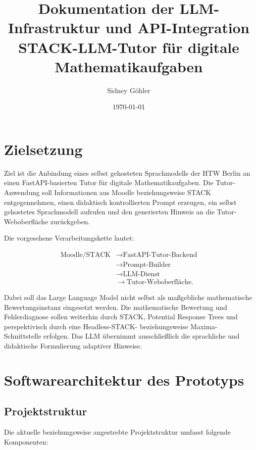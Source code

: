 \documentclass[11pt,a4paper,oneside,ngerman]{memoir}
\title{
    \textbf{Dokumentation der LLM-Infrastruktur und API-Integration}\\
    \large STACK-LLM-Tutor für digitale Mathematikaufgaben
}
\author{Sidney Göhler}
\date{\today}
\begin{document}
\maketitle
\tableofcontents
\clearpage

\chapter{Zielsetzung}

Ziel ist die Anbindung eines selbst gehosteten Sprachmodells der HTW Berlin an einen FastAPI-basierten Tutor für digitale Mathematikaufgaben. Die Tutor-Anwendung soll Informationen aus Moodle beziehungsweise STACK entgegennehmen, einen didaktisch kontrollierten Prompt erzeugen, ein selbst gehostetes Sprachmodell aufrufen und den generierten Hinweis an die Tutor-Weboberfläche zurückgeben.

Die vorgesehene Verarbeitungskette lautet:

\[
\begin{aligned}
\text{Moodle/STACK}
&\rightarrow \text{FastAPI-Tutor-Backend}\\
&\rightarrow \text{Prompt-Builder}\\
&\rightarrow \text{LLM-Dienst}\\
&\rightarrow \text{Tutor-Weboberfläche}.
\end{aligned}
\]

Dabei soll das Large Language Model nicht selbst als maßgebliche mathematische Bewertungsinstanz eingesetzt werden. Die mathematische Bewertung und Fehlerdiagnose sollen weiterhin durch STACK, Potential Response Trees und perspektivisch durch eine Headless-STACK- beziehungsweise Maxima-Schnittstelle erfolgen. Das LLM übernimmt ausschließlich die sprachliche und didaktische Formulierung adaptiver Hinweise.

\chapter{Softwarearchitektur des Prototyps}

\section{Projektstruktur}

Die aktuelle beziehungsweise angestrebte Projektstruktur umfasst folgende Komponenten:
\end{document}
